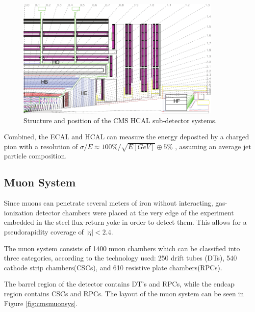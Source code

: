      \begin{figure}[h]
 	\centering
 	\includegraphics[width=0.9\textwidth]{figures/HCAL_subdet.pdf}
 	\singlespace
 	\caption{Structure and position of the CMS HCAL sub-detector systems.}
 	\label{fig:cmshcal}
	 \end{figure}

Combined, the ECAL and HCAL can measure the energy deposited by a charged pion with a resolution of $\sigma/E\approx100\%/\sqrt{E[GeV]}\oplus5\%$ \cite{Yazgan_2009}, assuming an average jet particle composition.

 \subsection{Muon System}
 Since muons can penetrate several meters of iron without interacting, gas-ionization detector chambers were placed at the very edge of the experiment embedded in the steel flux-return yoke in order to detect them. This allows for a pseudorapidity coverage of $|\eta| < 2.4$.

 The muon system consists of 1400 muon chambers which can be classified into three categories, according to the technology used: 250 drift tubes (DTs), 540 cathode strip chambers(CSCs), and 610 resistive plate chambers(RPCs).

 The barrel region of the detector contains DT's and RPCs, while the endcap region contains CSCs and RPCs. The layout of the muon system can be seen in Figure \ref{fig:cmsmuonsys}. 


